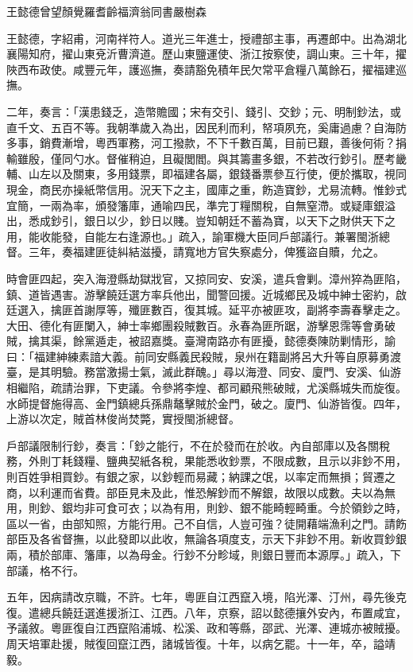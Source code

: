 
\begin{pinyinscope}
王懿德曾望顏覺羅耆齡福濟翁同書嚴樹森

王懿德，字紹甫，河南祥符人。道光三年進士，授禮部主事，再遷郎中。出為湖北襄陽知府，擢山東兗沂曹濟道。歷山東鹽運使、浙江按察使，調山東。三十年，擢陜西布政使。咸豐元年，護巡撫，奏請豁免積年民欠常平倉糧八萬餘石，擢福建巡撫。

二年，奏言：「漢患錢乏，造幣贍國；宋有交引、錢引、交鈔；元、明制鈔法，或直千文、五百不等。我朝準歲入為出，因民利而利，帑項夙充，奚庸過慮？自海防多事，銷費漸增，粵西軍務，河工撥款，不下千數百萬，目前已艱，善後何術？捐輸雖殷，僅同勺水。督催稍迫，且礙閭閻。與其籌畫多銀，不若改行鈔引。歷考畿輔、山左以及關東，多用錢票，即福建各屬，銀錢番票參互行使，便於攜取，視同現金，商民亦操紙幣信用。況天下之主，國庫之重，飭造寶鈔，尤易流轉。惟鈔式宜簡，一兩為率，頒發籓庫，通喻四民，準完丁糧關稅，自無窒滯。或疑庫銀溢出，悉成鈔引，銀日以少，鈔日以賤。豈知朝廷不蓄為寶，以天下之財供天下之用，能收能發，自能左右逢源也。」疏入，諭軍機大臣同戶部議行。兼署閩浙總督。三年，奏福建匪徒糾結滋擾，請寬地方官失察處分，俾獲盜自贖，允之。

時會匪四起，突入海澄縣劫獄戕官，又掠同安、安溪，遣兵會剿。漳州猝為匪陷，鎮、道皆遇害。游擊饒廷選方率兵他出，聞警回援。近城鄉民及城中紳士密約，啟廷選入，擒匪首謝厚等，殲匪數百，復其城。延平亦被匪攻，副將李壽春擊走之。大田、德化有匪闌入，紳士率鄉團殺賊數百。永春為匪所踞，游擊恩霈等會勇破賊，擒其渠，餘黨遁走，被詔嘉獎。臺灣南路亦有匪擾，懿德奏陳防剿情形，諭曰：「福建紳練素諳大義。前同安縣義民殺賊，泉州在籍副將呂大升等自原募勇渡臺，是其明驗。務當激揚士氣，滅此群醜。」尋以海澄、同安、廈門、安溪、仙游相繼陷，疏請治罪，下吏議。令參將李煌、都司顧飛熊破賊，尤溪縣城失而旋復。水師提督施得高、金門鎮總兵孫鼎鼇擊賊於金門，破之。廈門、仙游皆復。四年，上游以次定，賊首林俊尚焚斃，實授閩浙總督。

戶部議限制行鈔，奏言：「鈔之能行，不在於發而在於收。內自部庫以及各關稅務，外則丁耗錢糧、鹽典契紙各稅，果能悉收鈔票，不限成數，且示以非鈔不用，則百姓爭相買鈔。有銀之家，以鈔輕而易藏；納課之氓，以率定而無損；貿遷之商，以利運而省費。部臣見未及此，惟恐解鈔而不解銀，故限以成數。夫以為無用，則鈔、銀均非可食可衣；以為有用，則鈔、銀不能畸輕畸重。今於領鈔之時，區以一省，由部知照，方能行用。己不自信，人豈可強？徒開藉端漁利之門。請飭部臣及各省督撫，以此發即以此收，無論各項度支，示天下非鈔不用。新收買鈔銀兩，積於部庫、籓庫，以為母金。行鈔不分畛域，則銀日豐而本源厚。」疏入，下部議，格不行。

五年，因病請改京職，不許。七年，粵匪自江西竄入境，陷光澤、汀州，尋先後克復。遣總兵饒廷選進援浙江、江西。八年，京察，詔以懿德攘外安內，布置咸宜，予議敘。粵匪復自江西竄陷浦城、松溪、政和等縣，邵武、光澤、連城亦被賊擾。周天培軍赴援，賊復回竄江西，諸城皆復。十年，以病乞罷。十一年，卒，謚靖毅。


\end{pinyinscope}
